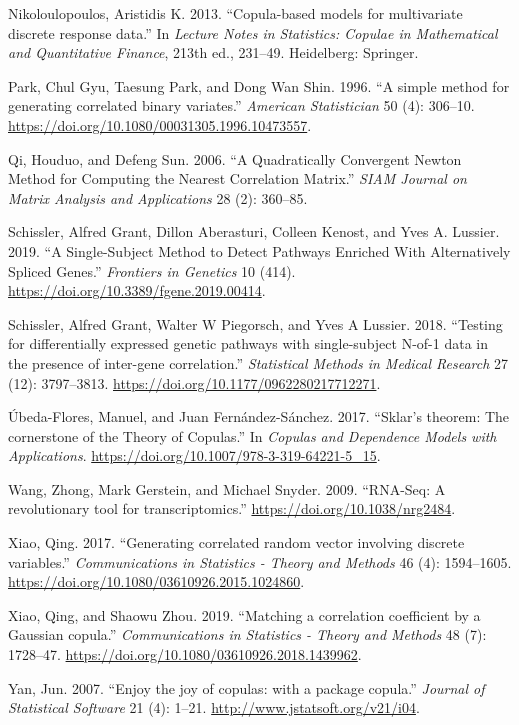 \documentclass{article}
\newlength{\cslhangindent}
\newenvironment{CSLReferences}[2] %
 {%
  \setlength{\parindent}{0pt}
  \ifodd #1 \everypar{\setlength{\hangindent}{\cslhangindent}}\ignorespaces\fi
  \ifnum #2 > 0
  \setlength{\parskip}{#2\baselineskip}
  \fi
 }%
 {}
\begin{document}
\begin{CSLReferences}{1}{0}
\leavevmode{}%
Nikoloulopoulos, Aristidis K. 2013. {``{Copula-based models for
multivariate discrete response data}.''} In \emph{Lecture Notes in
Statistics: Copulae in Mathematical and Quantitative Finance}, 213th
ed., 231--49. Heidelberg: Springer.

\leavevmode{}%
Park, Chul Gyu, Taesung Park, and Dong Wan Shin. 1996. {``{A simple
method for generating correlated binary variates}.''} \emph{American
Statistician} 50 (4): 306--10.
\url{https://doi.org/10.1080/00031305.1996.10473557}.

\leavevmode{}%
Qi, Houduo, and Defeng Sun. 2006. {``A Quadratically Convergent Newton
Method for Computing the Nearest Correlation Matrix.''} \emph{SIAM
Journal on Matrix Analysis and Applications} 28 (2): 360--85.

\leavevmode{}%
Schissler, Alfred Grant, Dillon Aberasturi, Colleen Kenost, and Yves A.
Lussier. 2019. {``{A Single-Subject Method to Detect Pathways Enriched
With Alternatively Spliced Genes}.''} \emph{Frontiers in Genetics} 10
(414). \url{https://doi.org/10.3389/fgene.2019.00414}.

\leavevmode{}%
Schissler, Alfred Grant, Walter W Piegorsch, and Yves A Lussier. 2018.
{``{Testing for differentially expressed genetic pathways with
single-subject N-of-1 data in the presence of inter-gene
correlation}.''} \emph{Statistical Methods in Medical Research} 27 (12):
3797--3813. \url{https://doi.org/10.1177/0962280217712271}.

\leavevmode{}%
Úbeda-Flores, Manuel, and Juan Fernández-Sánchez. 2017. {``{Sklar's
theorem: The cornerstone of the Theory of Copulas}.''} In \emph{Copulas
and Dependence Models with Applications}.
\url{https://doi.org/10.1007/978-3-319-64221-5_15}.

\leavevmode{}%
Wang, Zhong, Mark Gerstein, and Michael Snyder. 2009. {``{RNA-Seq: A
revolutionary tool for transcriptomics}.''}
\url{https://doi.org/10.1038/nrg2484}.

\leavevmode{}%
Xiao, Qing. 2017. {``{Generating correlated random vector involving
discrete variables}.''} \emph{Communications in Statistics - Theory and
Methods} 46 (4): 1594--1605.
\url{https://doi.org/10.1080/03610926.2015.1024860}.

\leavevmode{}%
Xiao, Qing, and Shaowu Zhou. 2019. {``{Matching a correlation
coefficient by a Gaussian copula}.''} \emph{Communications in Statistics
- Theory and Methods} 48 (7): 1728--47.
\url{https://doi.org/10.1080/03610926.2018.1439962}.

\leavevmode{}%
Yan, Jun. 2007. {``{Enjoy the joy of copulas: with a package copula}.''}
\emph{Journal of Statistical Software} 21 (4): 1--21.
\url{http://www.jstatsoft.org/v21/i04}.

\end{CSLReferences}



\end{document}
